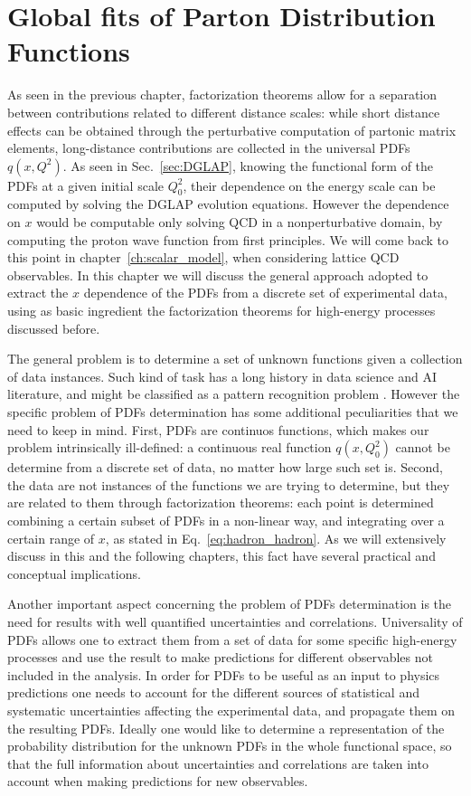 \chapter{Global fits of Parton Distribution Functions} 
\label{ch:nnpdf_methodology}
As seen in the previous chapter, factorization theorems allow for a separation between contributions 
related to different distance scales: while short distance
effects can be obtained through the perturbative computation of partonic matrix elements, 
long-distance contributions are collected in the universal PDFs $q\left(x,Q^2\right)$. As seen in Sec.~\ref{sec:DGLAP},
knowing the functional form of the PDFs at a given initial scale $Q_0^2$, 
their dependence on the energy scale can be computed by solving the DGLAP evolution equations.
However the dependence on $x$ would be computable only solving QCD in a nonperturbative domain, 
by computing the proton wave function from first principles. We will come back to 
this point in chapter~\ref{ch:scalar_model}, when considering lattice QCD observables.
In this chapter we will discuss the general approach adopted to extract the $x$ dependence of the PDFs
from a discrete set of experimental data, using as basic ingredient the factorization theorems for high-energy processes
discussed before.

%
The general problem is to determine a set of unknown functions given
a collection of data instances. Such kind of task has a long history in data science and AI literature, 
and might be classified as a pattern recognition problem \cite{Forte:2020yip}.
However the specific problem of PDFs determination has some additional peculiarities that we need to keep in mind.
First, PDFs are continuos functions, which makes our problem intrinsically ill-defined: a continuous real function
$q\left(x,Q_0^2\right)$ cannot be determine from a discrete set of data, no matter how large such set is.
Second, the data are not instances of the functions we are trying to determine, but they are related to 
them through factorization theorems: each point is determined combining a certain subset of PDFs in a non-linear way,
and integrating over a certain range of $x$, as stated in Eq.~\eqref{eq:hadron_hadron}. 
As we will extensively discuss in this and the following chapters,
this fact have several practical and conceptual implications.

%
Another important aspect concerning the problem of PDFs determination 
is the need for results with well quantified uncertainties and correlations.
Universality of PDFs allows one to extract them from a set of data for some specific high-energy processes
and use the result to make predictions for different observables not included in the analysis.
In order for PDFs to be useful as an input to physics predictions one needs to account for the different
sources of statistical and systematic uncertainties affecting the experimental data, and
propagate them on the resulting PDFs.
Ideally one would like to determine a representation 
of the probability distribution for the unknown PDFs in the whole functional space, so that the full information
about uncertainties and correlations are taken into account when making predictions for new observables.

